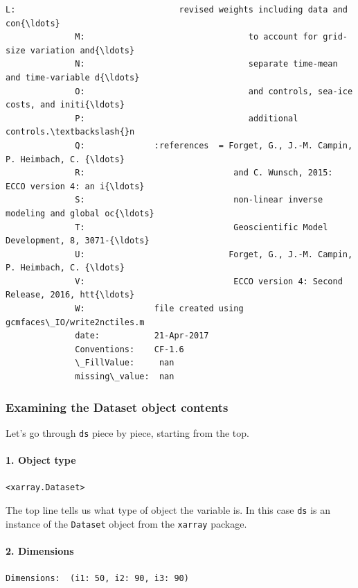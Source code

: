 \documentclass[11pt]{article}
\begin{document}
\begin{Verbatim}[commandchars=\\\{\}]
              L:                                 revised weights including data and con{\ldots}
              M:                                 to account for grid-size variation and{\ldots}
              N:                                 separate time-mean and time-variable d{\ldots}
              O:                                 and controls, sea-ice costs, and initi{\ldots}
              P:                                 additional controls.\textbackslash{}n 
              Q:              :references  = Forget, G., J.-M. Campin, P. Heimbach, C. {\ldots}
              R:                              and C. Wunsch, 2015: ECCO version 4: an i{\ldots}
              S:                              non-linear inverse modeling and global oc{\ldots}
              T:                              Geoscientific Model Development, 8, 3071-{\ldots}
              U:                             Forget, G., J.-M. Campin, P. Heimbach, C. {\ldots}
              V:                              ECCO version 4: Second Release, 2016, htt{\ldots}
              W:              file created using gcmfaces\_IO/write2nctiles.m
              date:           21-Apr-2017
              Conventions:    CF-1.6
              \_FillValue:     nan
              missing\_value:  nan
\end{Verbatim}
            
    \subsubsection{Examining the Dataset object
contents}\label{examining-the-dataset-object-contents}

Let's go through \texttt{ds} piece by piece, starting from the top.

\paragraph{1. Object type}\label{object-type}

\texttt{\textless{}xarray.Dataset\textgreater{}}

The top line tells us what type of object the variable is. In this case
\texttt{ds} is an instance of the \texttt{Dataset} object from the
\texttt{xarray} package.

\paragraph{2. Dimensions}\label{dimensions}

\texttt{Dimensions:\ \ (i1:\ 50,\ i2:\ 90,\ i3:\ 90)}
\end{document}
